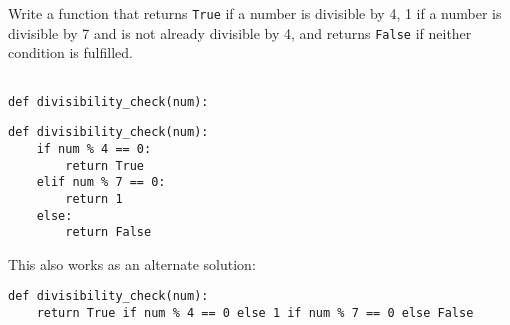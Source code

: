 \begin{blocksection}
\question Write a function that returns \lstinline{True} if a number is divisible by 4, 1 if a number is divisible by 7 and is not already divisible by 4, and returns \lstinline{False} if neither condition is fulfilled.

\begin{lstlisting}

def divisibility_check(num):

\end{lstlisting}


\vspace{2in}
\begin{solution}[1in]
\begin{lstlisting}
def divisibility_check(num):
    if num % 4 == 0:
        return True
    elif num % 7 == 0:
        return 1
    else:
        return False
\end{lstlisting}
This also works as an alternate solution:
\begin{lstlisting}
def divisibility_check(num):
    return True if num % 4 == 0 else 1 if num % 7 == 0 else False
\end{lstlisting}
\end{solution}
\end{blocksection}